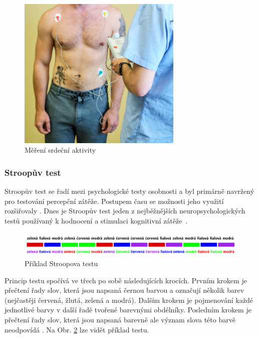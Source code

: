 \begin{figure}[h]
    \begin{center}
        \includegraphics[width=0.7\textwidth]{../assets/device/holter2}
        \caption{Měření srdeční aktivity}
        \label{fig:device_usage}
    \end{center}
\end{figure}

\subsubsection{Stroopův test}
\label{section:stroop_test}
Stroopův test se řadí mezi psychologické testy osobnosti a byl primárně navržený
pro testování percepční zátěže. Postupem času se možnosti jeho využití
rozšiřovaly \cite{Svoboda1999}. Dnes je Stroopův test jeden z nejběžnějších
neuropsychologických testů používaný k hodnocení  a stimulaci kognitivní
zátěže~\cite{Scarpina2017}.

\begin{figure}[h]
    \begin{center}
        \includegraphics[width=1\textwidth]{../assets/figures/stroop}
        \caption{Příklad Stroopova testu \cite{stroopWiki}}
        \label{fig:stroop}
    \end{center}
\end{figure}

Princip testu spočívá ve třech po sobě následujících krocích. Prvním krokem je
přečtení řady slov, která jsou napsaná černou barvou a označují několik barev
(nejčastěji červená, žlutá, zelená a modrá). Dalším krokem je pojmenování každé
jednotlivé barvy v další řadě tvořené barevnými obdélníky. Posledním krokem je
přečtení řady slov, která jsou napsaná barevně ale význam slova této barvě
neodpovídá \cite{Svoboda1999}. Na Obr. \ref{fig:stroop} lze vidět příklad testu.

